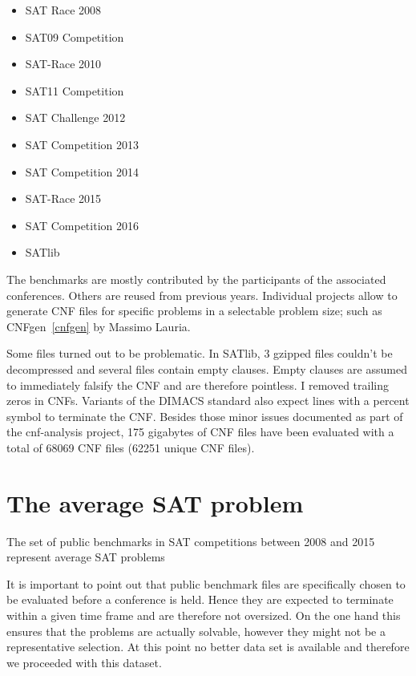 \begin{itemize}
  \itemsep2pt
  \item SAT Race 2008
  \item SAT09 Competition
  \item SAT-Race 2010
  \item SAT11 Competition
  \item SAT Challenge 2012
  \item SAT Competition 2013
  \item SAT Competition 2014
  \item SAT-Race 2015
  \item SAT Competition 2016
  \item SATlib
\end{itemize}
The benchmarks are mostly contributed by the participants of the associated conferences.
Others are reused from previous years. Individual projects allow to generate CNF files
for specific problems in a selectable problem size; such as CNFgen~\ref{cnfgen} by
Massimo Lauria.

Some files turned out to be problematic. In SATlib, 3 gzipped files couldn't be decompressed and several files
contain empty clauses. Empty clauses are assumed to immediately falsify the CNF and are therefore pointless.
I removed trailing zeros in CNFs. Variants of the DIMACS standard also expect lines with a percent symbol to
terminate the CNF. Besides those minor issues documented as part of the cnf-analysis project,
175 gigabytes of CNF files have been evaluated with a total of 68069 CNF files (62251 unique CNF files).

\section{The average SAT problem}
\label{sec:features-average}
%
\begin{prop}
  The set of public benchmarks in SAT competitions between 2008 and 2015
  represent average SAT problems
\end{prop}

It is important to point out that public benchmark files are specifically chosen
to be evaluated before a conference is held. Hence they are expected to terminate
within a given time frame and are therefore not oversized. On the one hand this
ensures that the problems are actually solvable, however they might not be a
representative selection. At this point no better data set is available and therefore
we proceeded with this dataset.

